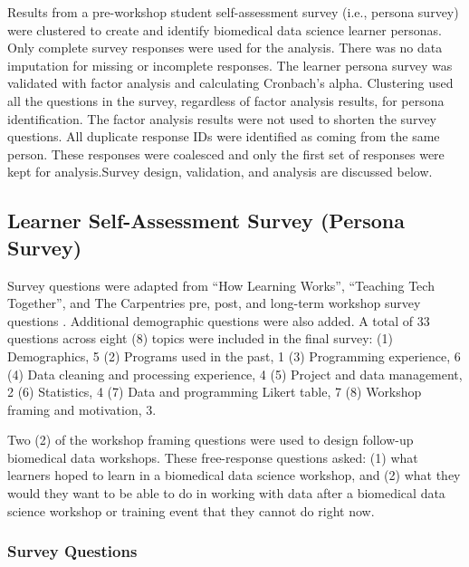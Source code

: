 \documentclass[020-persona\_validation.tex]{subfiles}
\begin{document}
    Results from a pre-workshop student self-assessment survey (i.e., persona survey)
    were clustered to create and identify biomedical data science learner personas.
    Only complete survey responses were used for the analysis.
    There was no data imputation for missing or incomplete responses.
    The learner persona survey was validated with factor analysis and calculating Cronbach's alpha.
    Clustering used all the questions in the survey,
    regardless of factor analysis results,
    for persona identification.
    The factor analysis results were not used to shorten the survey questions.
    All duplicate response IDs were identified as coming from the same person.
    These responses were coalesced and only the first set of responses were kept for analysis.Survey design, validation, and analysis are discussed below.
    
    \subsection{Learner Self-Assessment Survey (Persona Survey)}
    
        Survey questions were adapted from
        ``How Learning Works'',
        ``Teaching Tech Together'', and
        The Carpentries pre, post, and long-term workshop survey questions
        \cite{ambrose2010learning, wilson2019teaching, jordanAnalysisSoftwareData2018, jordanAnalysisCarpentriesLongTerm2020, jordanAnalysisCarpentriesLongTerm2018, jordanAnalysisCarpentriesLongTerm2017}.
        Additional demographic questions were also added.
        A total of 33 questions across eight (8) topics were included in the final survey:
        (1) Demographics, 5
        (2) Programs used in the past, 1
        (3) Programming experience, 6
        (4) Data cleaning and processing experience, 4
        (5) Project and data management, 2
        (6) Statistics, 4
        (7) Data and programming Likert table, 7
        (8) Workshop framing and motivation, 3.
        
        Two (2) of the workshop framing questions were used to design follow-up biomedical data workshops.
        These free-response questions asked:
        (1) what learners hoped to learn in a biomedical data science workshop, and 
        (2) what they would they want to be able to do in working with data after a biomedical data science workshop
            or training event that they cannot do right now.

        \subsubsection{Survey Questions}
    
\end{document}
